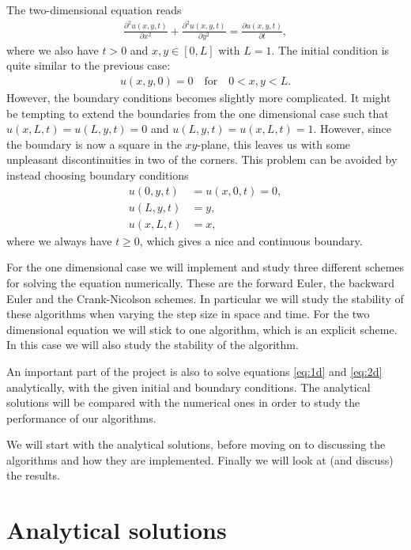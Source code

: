 \documentclass[12pt, a4paper]{article}
\begin{document}
The two-dimensional equation reads 
\begin{align}
\frac{\partial ^2 u(x,y,t)}{\partial x^2} + \frac{\partial ^2 u(x,y,t)}{\partial y^2} = 
\frac{\partial u(x,y,t)}{\partial t},  
\label{eq:2d}
\end{align}
where we also have $t>0$ and $x,y \in [0,L]$ with $L=1$. The initial condition is quite similar to the 
previous case:   
\begin{align*}
u(x,y,0) = 0 \quad \text{for}  \quad 0<x,y<L.  
\end{align*} 
However, the boundary conditions becomes slightly more complicated. It might be tempting to extend the 
boundaries from the one dimensional case such that $u(x,L,t)=u(L,y,t)=0$ and $u(L,y,t)=u(x,L,t)=1$. 
However, since the boundary is now a square in the $xy$-plane, this leaves us with some unpleasant 
discontinuities in two of the corners. This problem can be avoided by instead choosing boundary conditions 
\begin{align*}
u(0,y,t) & = u(x,0,t) = 0,  \\
u(L,y,t) & = y, \\ 
u(x,L,t) & = x, 
\end{align*}
where we always have $t\geq 0$, which gives a nice and continuous boundary. 

For the one dimensional case we will implement and study three different 
schemes for solving the equation numerically. These are the forward Euler, the backward Euler and the 
Crank-Nicolson schemes. In particular we will study the stability of these algorithms when varying the 
step size in space and time. For the two dimensional equation we will stick to one algorithm, which is 
an explicit scheme. In this case we will also study the stability of the algorithm. 

An important part of the project is also to solve equations \ref{eq:1d} and \ref{eq:2d} analytically, 
with the given initial and boundary conditions. The analytical solutions will be compared 
with the numerical ones in order to study the performance of our algorithms.   

We will start with the analytical solutions, before moving on to discussing the algorithms and how they 
are implemented. Finally we will look at (and discuss) the results. 

\section{Analytical solutions}
\end{document}
